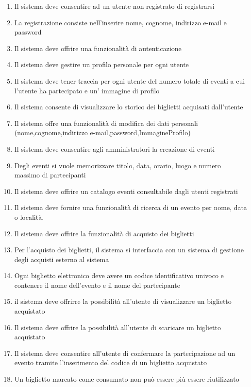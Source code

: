\begin{enumerate}[]
    \item Il sistema deve consentire ad un utente non registrato di registrarsi
    \item La registrazione consiste nell’inserire nome, cognome, indirizzo e-mail e password
    \item Il sistema deve offrire una funzionalità di autenticazione
    \item Il sistema deve gestire un profilo personale per ogni utente
    \item Il sistema deve tener traccia per ogni utente del numero totale di eventi a cui l’utente ha partecipato e un' immagine di profilo
    \item Il sistema consente di visualizzare lo storico dei biglietti acquisati dall'utente
    \item Il sistema offre una funzionalità di modifica dei dati personali (nome,cognome,indirizzo e-mail,password,ImmagineProfilo)
    \item Il sistema deve consentire agli amministratori la creazione di eventi
    \item Degli eventi si vuole memorizzare titolo, data, orario, luogo e numero massimo di partecipanti
    \item Il sistema deve offrire un catalogo eventi consultabile dagli utenti registrati
    \item Il sistema deve fornire una funzionalità di ricerca di un evento per nome, data o località.
    \item Il sistema deve offrire la funzionalità di acquisto dei biglietti
    \item Per l’acquisto dei biglietti, il sistema si interfaccia con un sistema di gestione degli acquisti esterno al sistema
    \item Ogni biglietto elettronico deve avere un codice identificativo univoco e contenere il nome dell’evento e il nome del partecipante
    \item il sistema deve offrirre la possibilità all'utente di visualizzare un biglietto acquistato
    \item Il sistema deve offrire la possibilità all'utente di scaricare un biglietto acquistato
    \item Il sistema deve consentire all’utente di confermare la partecipazione ad un evento tramite l’inserimento del codice di un biglietto acquistato
    \item Un biglietto marcato come consumato non può essere più essere riutilizzato

\end{enumerate}
